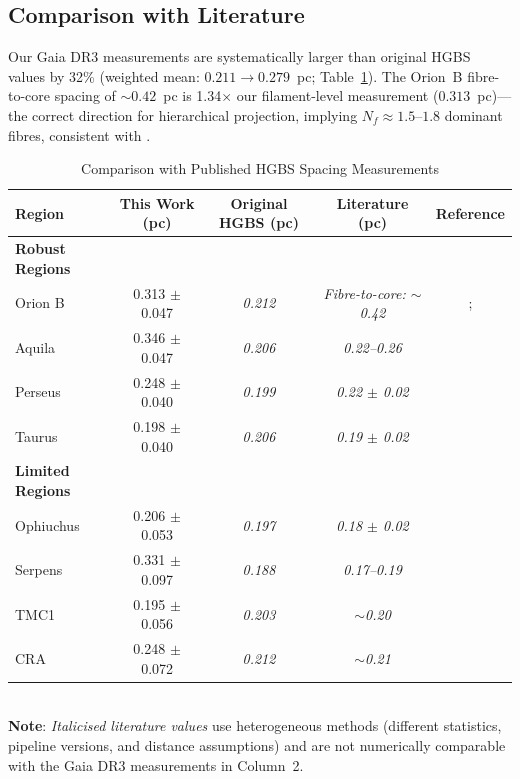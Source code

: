 \documentclass[twoside,twocolumn]{mnras}
\begin{document}
\subsection{Comparison with Literature}

Our Gaia DR3 measurements are systematically larger than original HGBS values by 32\%
(weighted mean: $0.211 \to 0.279$~pc; Table~\ref{tab:literature}). The Orion~B
fibre-to-core spacing of ${\sim}0.42$~pc \citep{Yang2024} is 1.34$\times$ our
filament-level measurement ($0.313$~pc)---the correct direction for hierarchical
projection, implying $N_f \approx 1.5$--$1.8$ dominant fibres, consistent with
\citet{Hacar2018}. 

\begin{table}
\caption{Comparison with Published HGBS Spacing Measurements}
\label{tab:literature}
\begin{tabular}{lcccc}
\toprule
Region & This Work (pc) & Original HGBS (pc) & Literature (pc) & Reference \\
\midrule
\textbf{Robust Regions} &  &  &  &  \\
Orion B & 0.313 $\pm$ 0.047 & \textit{0.212} & \textit{Fibre-to-core: ${\sim}$0.42} & \citet{Konyves2020}; \citet{Yang2024} \\
Aquila  & 0.346 $\pm$ 0.047 & \textit{0.206} & \textit{0.22--0.26} & \citet{Konyves2015} \\
Perseus & 0.248 $\pm$ 0.040 & \textit{0.199} & \textit{0.22 $\pm$ 0.02} & \citet{Andre2016} \\
Taurus  & 0.198 $\pm$ 0.040 & \textit{0.206} & \textit{0.19 $\pm$ 0.02} & \citet{Hacar2013} \\
\midrule
\textbf{Limited Regions} &  &  &  &  \\
Ophiuchus & 0.206 $\pm$ 0.053 & \textit{0.197} & \textit{0.18 $\pm$ 0.02} & \citet{Konyves2020} \\
Serpens  & 0.331 $\pm$ 0.097 & \textit{0.188} & \textit{0.17--0.19} & \citet{Konyves2020} \\
TMC1     & 0.195 $\pm$ 0.056 & \textit{0.203} & \textit{${\sim}$0.20} & \citet{Hacar2013} \\
CRA      & 0.248 $\pm$ 0.072 & \textit{0.212} & \textit{${\sim}$0.21} & \citet{Konyves2020} \\
\bottomrule
\end{tabular}
\\ \footnotesize \textbf{Note}: \textit{Italicised literature values} use heterogeneous methods (different statistics, pipeline versions, and distance assumptions) and are not numerically comparable with the Gaia DR3 measurements in Column~2.
\end{table}
\end{document}
